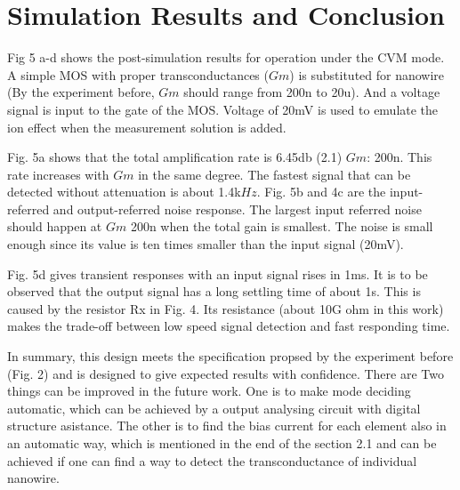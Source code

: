 \documentclass{article}
\begin{document}
\section{Simulation Results and Conclusion}
\label{sec:conclusion}

Fig 5 a-d shows the post-simulation results for operation under the CVM mode.
A simple MOS with proper transconductances ($Gm$) is substituted for nanowire (By the experiment before, $Gm$ should range from 200n to 20u).
And a voltage signal is input to the gate of the MOS.
Voltage of 20mV is used to emulate the ion effect when the measurement solution is added.

Fig. 5a shows that the total amplification rate is 6.45db (2.1) $Gm$: 200n.
This rate increases with $Gm$ in the same degree.
The fastest signal that can be detected without attenuation is about 1.4k$Hz$.
Fig. 5b and 4c are the input-referred and output-referred noise response.
The largest input referred noise should happen at $Gm$ 200n when the total gain is smallest.
The noise is small enough since its value is ten times smaller than the input signal (20mV).

Fig. 5d gives transient responses with an input signal rises in 1ms.
It is to be observed that the output signal has a long settling time of about 1s.
This is caused by the resistor Rx in Fig. 4.
Its resistance (about 10G ohm in this work) makes the trade-off between low speed signal detection and fast responding time.


In summary, this design meets the specification propsed by the experiment before (Fig. 2) and is designed to give expected results with confidence.
There are Two things can be improved in the future work.
One is to make mode deciding automatic, which can be achieved by a output analysing circuit with digital structure asistance.
The other is to find the bias current for each element also in an automatic way, which is mentioned in the end of the section 2.1
and can be achieved if one can find a way to detect the transconductance of individual nanowire.





\end{document}
